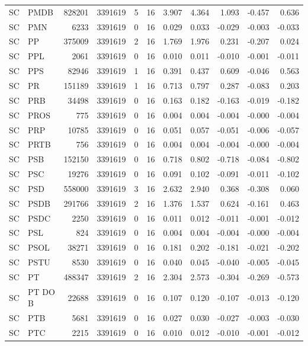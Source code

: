 \begin{landscape}
\begin{longtable}{llrrrrrrrrr}
SC & PMDB & 828201 & 3391619 & 5 & 16 & 3.907 & 4.364 & 1.093 & -0.457 & 0.636 \\
SC & PMN & 6233 & 3391619 & 0 & 16 & 0.029 & 0.033 & -0.029 & -0.003 & -0.033 \\
SC & PP & 375009 & 3391619 & 2 & 16 & 1.769 & 1.976 & 0.231 & -0.207 & 0.024 \\
SC & PPL & 2061 & 3391619 & 0 & 16 & 0.010 & 0.011 & -0.010 & -0.001 & -0.011 \\
SC & PPS & 82946 & 3391619 & 1 & 16 & 0.391 & 0.437 & 0.609 & -0.046 & 0.563 \\
SC & PR & 151189 & 3391619 & 1 & 16 & 0.713 & 0.797 & 0.287 & -0.083 & 0.203 \\
SC & PRB & 34498 & 3391619 & 0 & 16 & 0.163 & 0.182 & -0.163 & -0.019 & -0.182 \\
SC & PROS & 775 & 3391619 & 0 & 16 & 0.004 & 0.004 & -0.004 & -0.000 & -0.004 \\
SC & PRP & 10785 & 3391619 & 0 & 16 & 0.051 & 0.057 & -0.051 & -0.006 & -0.057 \\
SC & PRTB & 756 & 3391619 & 0 & 16 & 0.004 & 0.004 & -0.004 & -0.000 & -0.004 \\
SC & PSB & 152150 & 3391619 & 0 & 16 & 0.718 & 0.802 & -0.718 & -0.084 & -0.802 \\
SC & PSC & 19276 & 3391619 & 0 & 16 & 0.091 & 0.102 & -0.091 & -0.011 & -0.102 \\
SC & PSD & 558000 & 3391619 & 3 & 16 & 2.632 & 2.940 & 0.368 & -0.308 & 0.060 \\
SC & PSDB & 291766 & 3391619 & 2 & 16 & 1.376 & 1.537 & 0.624 & -0.161 & 0.463 \\
SC & PSDC & 2250 & 3391619 & 0 & 16 & 0.011 & 0.012 & -0.011 & -0.001 & -0.012 \\
SC & PSL & 824 & 3391619 & 0 & 16 & 0.004 & 0.004 & -0.004 & -0.000 & -0.004 \\
SC & PSOL & 38271 & 3391619 & 0 & 16 & 0.181 & 0.202 & -0.181 & -0.021 & -0.202 \\
SC & PSTU & 8530 & 3391619 & 0 & 16 & 0.040 & 0.045 & -0.040 & -0.005 & -0.045 \\
SC & PT & 488347 & 3391619 & 2 & 16 & 2.304 & 2.573 & -0.304 & -0.269 & -0.573 \\
SC & PT DO B & 22688 & 3391619 & 0 & 16 & 0.107 & 0.120 & -0.107 & -0.013 & -0.120 \\
SC & PTB & 5681 & 3391619 & 0 & 16 & 0.027 & 0.030 & -0.027 & -0.003 & -0.030 \\
SC & PTC & 2215 & 3391619 & 0 & 16 & 0.010 & 0.012 & -0.010 & -0.001 & -0.012 \\

\end{longtable}
\end{landscape}
